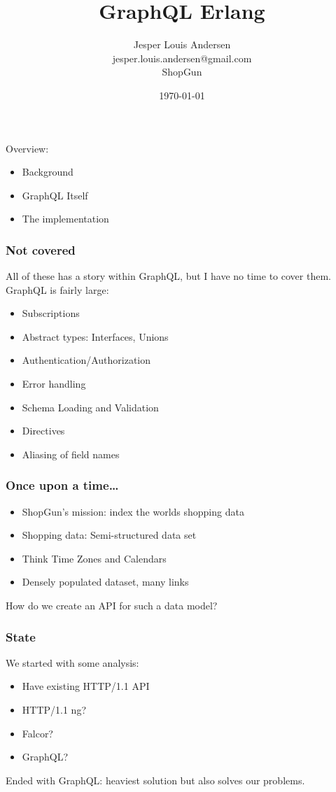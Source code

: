 \documentclass[lualatex]{beamer}
\author{Jesper Louis
  Andersen\\jesper.louis.andersen@gmail.com\\ShopGun}
\date{\today{}}
\title{GraphQL Erlang}
\begin{document}
\maketitle

\begin{frame}
  Overview:
  \begin{itemize}
  \item Background
  \item GraphQL Itself
  \item The implementation
  \end{itemize}
\end{frame}

\begin{frame}
  \frametitle{Not covered}
  All of these has a story within GraphQL, but I have no time to cover
  them. GraphQL is fairly large:
  \begin{itemize}
  \item Subscriptions
  \item Abstract types: Interfaces, Unions
  \item Authentication/Authorization
  \item Error handling
  \item Schema Loading and Validation
  \item Directives
  \item Aliasing of field names
  \end{itemize}
\end{frame}

\begin{frame}
  \frametitle{Once upon a time\ldots{}}
  \begin{itemize}
  \item ShopGun's mission: index the worlds shopping data
  \item Shopping data: Semi-structured data set
  \item Think Time Zones and Calendars
  \item Densely populated dataset, many links
  \end{itemize}

  How do we create an API for such a data model?
\end{frame}

\begin{frame}
  \frametitle{State}
  We started with some analysis:
  \begin{itemize}
  \item Have existing HTTP/1.1 API
  \item HTTP/1.1 ng?
  \item Falcor?
  \item GraphQL?
  \end{itemize}

  Ended with GraphQL: heaviest solution but also solves our problems.
\end{frame}
\end{document}
